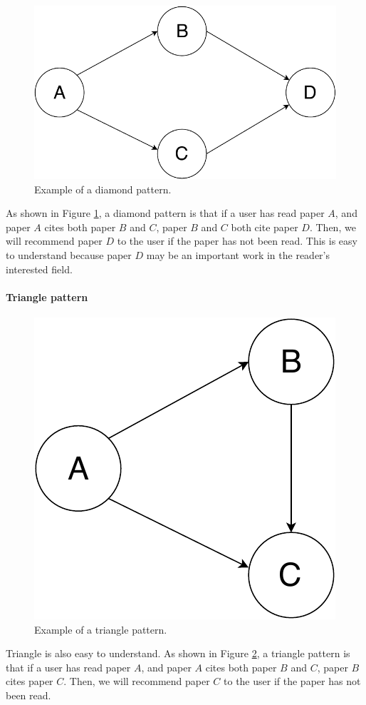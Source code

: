 \begin{figure}[t]
	\centering
	\includegraphics[width=0.7\linewidth]{diamond.pdf}
	\caption{Example of a diamond pattern.}
	\label{fig:diamond}
\end{figure}

As shown in Figure \ref{fig:diamond}, a diamond pattern is that if a user has read paper $A$, and paper $A$ cites both paper $B$ and $C$, paper $B$ and $C$ both cite paper $D$. Then, we will recommend paper $D$ to the user if the paper has not been read. This is easy to understand because paper $D$ may be an important work in the reader's interested field.

\paragraph{Triangle pattern}

\begin{figure}[t]
	\centering
	\includegraphics[width=0.5\linewidth]{triangle}
	\caption{Example of a triangle pattern.}
	\label{fig:triangle}
\end{figure}

Triangle is also easy to understand. As shown in Figure \ref{fig:triangle}, a triangle pattern is that if a user has read paper $A$, and paper $A$ cites both paper $B$ and $C$, paper $B$ cites paper $C$. Then, we will recommend paper $C$ to the user if the paper has not been read. 

